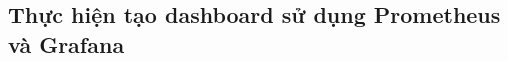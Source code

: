 \subsection{Thực hiện tạo dashboard sử dụng Prometheus và Grafana}\label{dashboard-prometheus-grafana}
